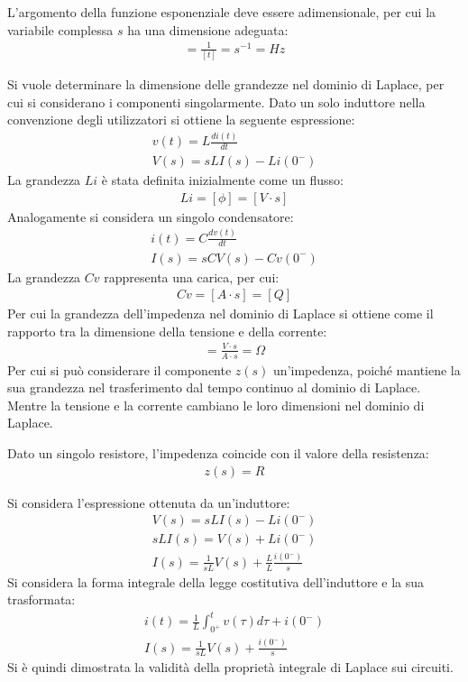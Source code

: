 \documentclass{article}
\numberwithin{equation}{subsection}
\begin{document}
L'argomento della funzione esponenziale deve essere adimensionale, per cui la variabile complessa $s$ ha una dimensione adeguata:
\begin{gather*}
    [s]=\displaystyle\frac{1}{[t]}=s^{-1}=Hz
\end{gather*}

Si vuole determinare la dimensione delle grandezze nel dominio di Laplace, per cui si considerano i componenti singolarmente. Dato un solo induttore nella convenzione degli 
utilizzatori si ottiene la seguente espressione:
\begin{gather*}
    v(t)=L\displaystyle\frac{di(t)}{dt}\\
    V(s)=sLI(s)-Li(0^-)
\end{gather*}
La grandezza $Li$ è stata definita inizialmente come un flusso:
\begin{gather*}
    Li=[\phi]=[V\cdot s]
\end{gather*}
Analogamente si considera un singolo condensatore:
\begin{gather*}
    i(t)=C\displaystyle\frac{dv(t)}{dt}\\
    I(s)=sCV(s)-Cv(0^-)
\end{gather*}
La grandezza $Cv$ rappresenta una carica, per cui:
\begin{gather*}
    Cv=[A\cdot s]=[Q]
\end{gather*}
Per cui la grandezza dell'impedenza nel dominio di Laplace si ottiene come il rapporto tra la dimensione della tensione e della corrente:
\begin{gather*}
    [z]=\displaystyle\frac{V\cdot s}{A\cdot s}=\Omega
\end{gather*}
Per cui si può considerare il componente $z(s)$ un'impedenza, poiché mantiene la sua grandezza nel trasferimento dal tempo continuo al dominio di Laplace. Mentre la tensione 
e la corrente cambiano le loro dimensioni nel dominio di Laplace. 


Dato un singolo resistore, l'impedenza coincide con il valore della resistenza:
\begin{gather*}
    z(s)=R
\end{gather*}

Si considera l'espressione ottenuta da un'induttore:
\begin{gather*}
    V(s)=sLI(s)-Li(0^-)\\
    sLI(s)=V(s)+Li(0^-)\\
    I(s)=\displaystyle\frac{1}{sL}V(s)+\frac{L}{L}\frac{i(0^-)}{s}
\end{gather*}
Si considera la forma integrale della legge costitutiva dell'induttore e la sua trasformata:
\begin{gather*}
    i(t)=\displaystyle\frac{1}{L}\int_{0^+}^tv(\tau)d\tau+i(0^-)\\
    I(s)=\displaystyle\frac{1}{sL}V(s)+\frac{i(0^-)}{s}
\end{gather*}
Si è quindi dimostrata la validità della proprietà integrale di Laplace sui circuiti. 
\end{document}
